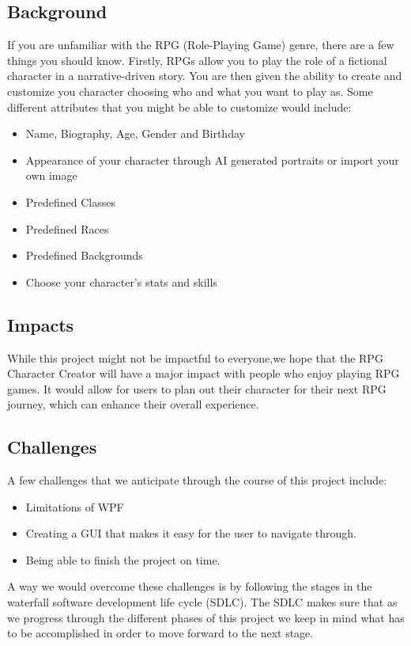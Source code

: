 \documentclass[10pt,conference,onecolumn,compsoc]{IEEEtran}
\begin{document}
\subsection{Background}
If you are unfamiliar with the RPG (Role-Playing Game) genre, there are a few things you should know. Firstly, RPGs allow you to play the role of a fictional character in a narrative-driven story. You are then given the ability to create and customize you character choosing who and what you want to play as. Some different attributes that you might be able to customize would include:
\begin{itemize}
\item Name, Biography, Age, Gender and Birthday
\item Appearance of your character through AI generated portraits or import your own image
\item Predefined Classes
\item Predefined Races
\item Predefined Backgrounds
\item Choose your character's stats and skills
\end{itemize}

\subsection{Impacts}
While this project might not be impactful to everyone,we hope that the RPG Character Creator will have a major impact with people who enjoy playing RPG games. It would allow for users to plan out their character for their next RPG journey, which can enhance their overall experience.

\subsection{Challenges}
A few challenges that we anticipate through the course of this project include:
\begin{itemize} 
\item Limitations of WPF
\item Creating a GUI that makes it easy for the user to navigate through.
\item Being able to finish the project on time.
\end{itemize}

A way we would overcome these challenges is by following the stages in the waterfall software development life cycle (SDLC). The SDLC makes sure that as we progress through the different phases of this project we keep in mind what has to be accomplished in order to move forward to the next stage.
\end{document}
